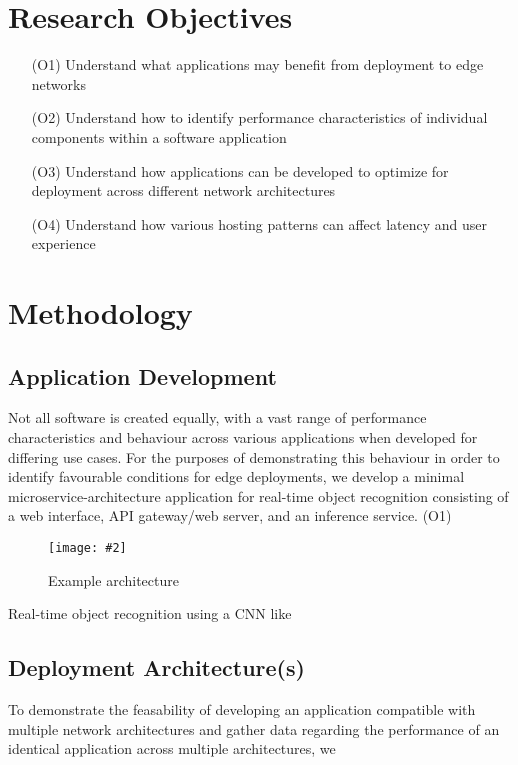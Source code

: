 \documentclass[11pt]{article}
\newcommand{\capfigure}[3][0.5] {
    \begin{figure}[H]
    \centering
    \texttt{[image: \#2]}
    \caption{#3}
    \end{figure}
}
\begin{document}
\section{Research Objectives}
\begin{itemize}
    \item [(O1)] {
        Understand what applications may benefit from deployment to edge networks
        }
    \item [(O2)] {
        Understand how to identify performance characteristics of individual components within
        a software application
        }
    \item [(O3)] {
        Understand how applications can be developed to optimize for deployment across different 
        network architectures
        }
    \item [(O4)] {
        Understand how various hosting patterns can affect latency and user experience
        }
\end{itemize}

\newpage
\section{Methodology}
\subsection{Application Development}
Not all software is created equally, with a vast range of performance characteristics and
behaviour across various applications when developed for differing use cases. For the purposes
of demonstrating this behaviour in order to identify favourable conditions for edge deployments, 
we develop a minimal microservice-architecture application for real-time object recognition 
consisting of a web interface, API gateway/web server, and an inference service. (O1)\newline

\capfigure[0.75]{images/applicationdesign1}{Example architecture}

Real-time object recognition using a CNN like

\subsection{Deployment Architecture(s)}
To demonstrate the feasability of developing an application compatible with multiple network 
architectures and gather data regarding the performance of an identical application across multiple
architectures, we
\end{document}
